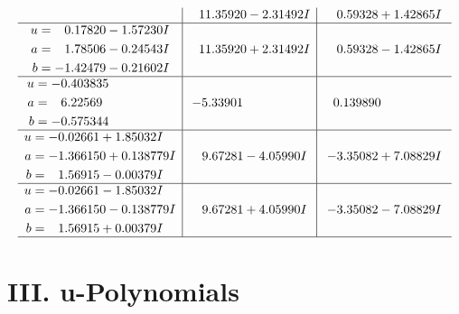 \documentclass[1p]{elsarticle_modified}
\theoremstyle{definition}
\begin{document}
$$\begin{array}{c|c|c}
 & \phantom{-}11.35920 - 2.31492 I & \phantom{-}0.59328 + 1.42865 I \\ \hline\begin{aligned}
u &= \phantom{-}0.17820 - 1.57230 I \\
a &= \phantom{-}1.78506 - 0.24543 I \\
b &= -1.42479 - 0.21602 I\end{aligned}
 & \phantom{-}11.35920 + 2.31492 I & \phantom{-}0.59328 - 1.42865 I \\ \hline\begin{aligned}
u &= -0.403835\phantom{ +0.000000I} \\
a &= \phantom{-}6.22569\phantom{ +0.000000I} \\
b &= -0.575344\phantom{ +0.000000I}\end{aligned}
 & -5.33901\phantom{ +0.000000I} & \phantom{-}0.139890\phantom{ +0.000000I} \\ \hline\begin{aligned}
u &= -0.02661 + 1.85032 I \\
a &= -1.366150 + 0.138779 I \\
b &= \phantom{-}1.56915 - 0.00379 I\end{aligned}
 & \phantom{-}9.67281 - 4.05990 I & -3.35082 + 7.08829 I \\ \hline\begin{aligned}
u &= -0.02661 - 1.85032 I \\
a &= -1.366150 - 0.138779 I \\
b &= \phantom{-}1.56915 + 0.00379 I\end{aligned}
 & \phantom{-}9.67281 + 4.05990 I & -3.35082 - 7.08829 I\\
 \hline 
 \end{array}$$\newpage
\newpage\renewcommand{\arraystretch}{1}
\centering \section*{ III. u-Polynomials}
\end{document}
